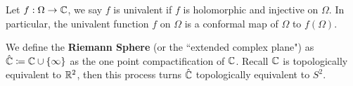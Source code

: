 \begin{definition}
    Let $f: \Omega \to \mathbb{C}$, we say $f$ is univalent if $f$ is holomorphic and injective on $\Omega$. In particular, the univalent function $f$ on $\Omega$ is a conformal map of $\Omega$ to $f(\Omega)$.
\end{definition}

\begin{definition}
    We define the \textbf{Riemann Sphere} (or the ``extended complex plane") as $\hat{\mathbb{C}} \coloneqq \mathbb{C} \cup \{\infty\}$ as the one point compactification of $\mathbb{C}$. Recall $\mathbb{C}$ is topologically equivalent to $\mathbb{R}^2$, then this process turns $\hat{\mathbb{C}}$ topologically equivalent to $S^2$.
\end{definition}
